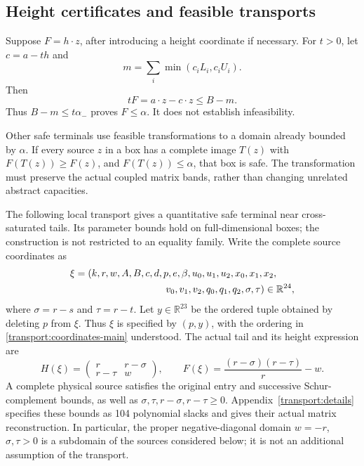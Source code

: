 \documentclass[11pt,reqno]{amsart}
\theoremstyle{definition}
\theoremstyle{remark}
\newcommand{\R}{\mathbb R}
\newcommand{\amin}{\alpha_-}
\begin{document}
\subsection{Height certificates and feasible transports}
Suppose \(F=h\cdot z\), after introducing a height coordinate if
necessary. For \(t>0\), let \(c=a-th\) and
\[
m=\sum_i\min(c_iL_i,c_iU_i).
\]
Then
\begin{equation}\label{eq:heightcert}
tF=a\cdot z-c\cdot z\le B-m.
\end{equation}
Thus \(B-m\le t\amin\) proves \(F\le\alpha\).
It does not establish infeasibility.

Other safe terminals use feasible transformations to a domain already
bounded by \(\alpha\). If every source \(z\) in a box has a complete
image \(T(z)\) with \(F(T(z))\ge F(z)\), and
\(F(T(z))\le\alpha\), that box is safe.
The transformation must preserve the actual coupled matrix bands,
rather than changing unrelated abstract capacities.

The following local transport gives a quantitative safe terminal near
cross-saturated tails.  Its parameter bounds hold on full-dimensional
boxes; the construction is not restricted to an equality family.
Write the complete source coordinates as
\begin{equation}\label{transport:coordinates-main}
\begin{split}
\xi={}&(k,r,w,A,B,c,d,p,e,\beta,u_0,u_1,u_2,x_0,x_1,x_2,\\
&\hspace{28mm}v_0,v_1,v_2,q_0,q_1,q_2,\sigma,\tau)\in\R^{24},
\end{split}
\end{equation}
where \(\sigma=r-s\) and \(\tau=r-t\).  Let \(y\in\R^{23}\)
be the ordered tuple obtained by deleting \(p\) from \(\xi\).
Thus \(\xi\) is specified by \((p,y)\), with the ordering in
\eqref{transport:coordinates-main} understood.  The actual tail and
its height expression are
\begin{equation}\label{transport:tail-height}
H(\xi)=\begin{pmatrix}r&r-\sigma\\r-\tau&w\end{pmatrix},
\qquad F(\xi)=\frac{(r-\sigma)(r-\tau)}r-w.
\end{equation}
A complete physical source satisfies the original entry and successive
Schur-complement bounds, as well as
\(\sigma,\tau,r-\sigma,r-\tau\ge0\).  Appendix~\ref{transport:details}
specifies these bounds as 104 polynomial slacks and gives their actual
matrix reconstruction.  In particular, the proper negative-diagonal
domain \(w=-r\), \(\sigma,\tau>0\) is a subdomain of the sources
considered below; it is not an additional assumption of the transport.
\end{document}
